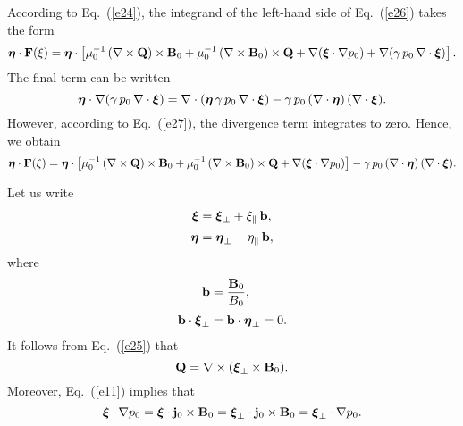 \documentclass[12pt,prb,aps,notitlepage]{revtex4-1}
\newcommand{\bxi}{\mbox{\boldmath$\xi$}}
\newcommand{\bta}{\mbox{\boldmath$\eta$}}
\begin{document}
According to Eq.~(\ref{e24}), the integrand of the left-hand side of Eq.~(\ref{e26}) takes the form 
\begin{equation}
\bta\cdot {\bf F}(\xi)= \bta\cdot\left[ \mu_0^{-1}\,(\nabla\times {\bf Q})\times{\bf B}_0+ \mu_0^{-1}\, (\nabla\times {\bf B}_0)\times {\bf Q}
+\nabla(\bxi\cdot\nabla p_0) + \nabla(\gamma\,p_0\,\nabla\cdot\bxi)\right].
\end{equation}
The final term can be written
\begin{equation}
\bta\cdot \nabla(\gamma\,p_0\,\nabla\cdot\bxi)= \nabla\cdot (\bta\,\gamma\,p_0\,\nabla\cdot\bxi)-\gamma\,p_0\,(\nabla\cdot\bta)\,(\nabla\cdot\bxi).
\end{equation}
However, according to Eq.~(\ref{e27}), the divergence term integrates to zero.
Hence, we obtain
\begin{equation}
\bta\cdot {\bf F}(\xi)= \bta\cdot\left[ \mu_0^{-1}\,(\nabla\times {\bf Q})\times{\bf B}_0+ \mu_0^{-1}\, (\nabla\times {\bf B}_0)\times {\bf Q}
+\nabla(\bxi\cdot\nabla p_0)\right] -\gamma\,p_0\,(\nabla\cdot\bta)\,(\nabla\cdot\bxi).
\end{equation}

Let us write
\begin{align}
\bxi &=\bxi_\perp + \xi_\parallel\,{\bf b},\\[0.5ex]
\bta&=\bta_\perp+\eta_\parallel\,{\bf b},
\end{align}
where 
\begin{align}
{\bf b} &=\frac{{\bf B}_0}{B_0},\\[0.5ex]
{\bf b} \cdot\bxi_\perp &= {\bf b}\cdot\bta_\perp = 0.
\end{align}
It follows from Eq.~(\ref{e25}) that
\begin{equation}\label{e36}
{\bf Q} = \nabla\times (\bxi_\perp\times {\bf B}_0).
\end{equation}
Moreover, Eq.~(\ref{e11}) implies that
\begin{equation}
\bxi\cdot\nabla p_0 = \bxi\cdot{\bf j}_0\times {\bf B}_0= \bxi_\perp\cdot{\bf j}_0\times {\bf B}_0= \bxi_\perp\cdot\nabla p_0.
\end{equation}
\end{document}
